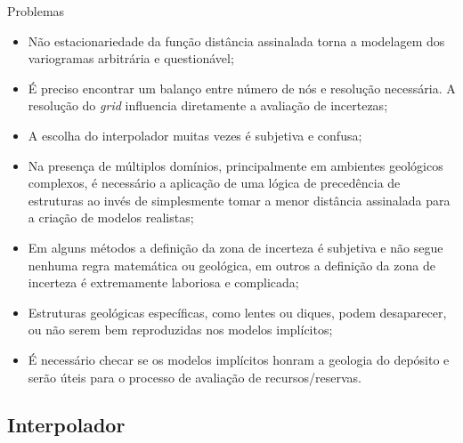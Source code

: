 \documentclass[aspectratio=169]{beamer}
\begin{document}
\begin{frame}[allowframebreaks]{Problemas}

	\begin{itemize}
		\item Não estacionariedade da função distância assinalada torna a modelagem dos variogramas arbitrária e questionável;
		\item É preciso encontrar um balanço entre número de nós e resolução necessária. A resolução do \textit{grid} influencia diretamente a avaliação de incertezas;
		\item A escolha do interpolador muitas vezes é subjetiva e confusa;
		\item Na presença de múltiplos domínios, principalmente em ambientes geológicos complexos, é necessário a aplicação de uma lógica de precedência de estruturas ao invés de simplesmente tomar a menor distância assinalada para a criação de modelos realistas;
		\item Em alguns métodos a definição da zona de incerteza é subjetiva e não segue nenhuma regra matemática ou geológica, em outros a definição da zona de incerteza é extremamente laboriosa e complicada;
		\item Estruturas geológicas específicas, como lentes ou diques, podem desaparecer, ou não serem bem reproduzidas nos modelos implícitos;
		\item É necessário checar se os modelos implícitos honram a geologia do depósito e serão úteis para o processo de avaliação de recursos/reservas.
	\end{itemize}

\end{frame}

\subsection{Interpolador}
\end{document}
